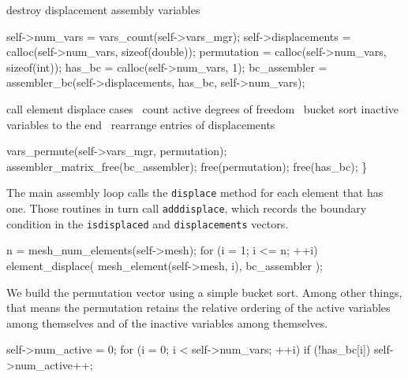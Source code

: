     \LA{}destroy displacement assembly variables~{\nwtagstyle{}}\RA{}

    self->num_vars      = vars_count(self->vars_mgr);
    self->displacements = calloc(self->num_vars, sizeof(double));
    permutation         = calloc(self->num_vars, sizeof(int));
    has_bc              = calloc(self->num_vars, 1);
    bc_assembler = assembler_bc(self->displacements, has_bc, self->num_vars);

    \LA{}call element \code{}displace\edoc{} cases~{\nwtagstyle{}}\RA{}
    \LA{}count active degrees of freedom~{\nwtagstyle{}}\RA{}
    \LA{}bucket sort inactive variables to the end~{\nwtagstyle{}}\RA{}
    \LA{}rearrange entries of \code{}displacements\edoc{}~{\nwtagstyle{}}\RA{}

    vars_permute(self->vars_mgr, permutation);
    assembler_matrix_free(bc_assembler);
    free(permutation);
    free(has_bc);
\}

\nwendcode{}\nwdocspar

The main assembly loop calls the {\tt{}displace} method for each
element that has one.  Those routines in turn call {\tt{}add{}displace},
which records the boundary condition in the {\tt{}is{}displaced} and
{\tt{}displacements} vectors.

\nwenddocs{}\endmoddef
n = mesh_num_elements(self->mesh);
for (i = 1; i <= n; ++i)
    element_displace( mesh_element(self->mesh, i), bc_assembler );

\nwendcode{}\nwdocspar

We build the permutation vector using a simple bucket sort.  Among
other things, that means the permutation retains the relative ordering
of the active variables among themselves and of the inactive variables
among themselves.

\nwenddocs{}\endmoddef
self->num_active = 0;
for (i = 0; i < self->num_vars; ++i)
    if (!has_bc[i])
        self->num_active++;
\nwendcode{}\nwdocspar


